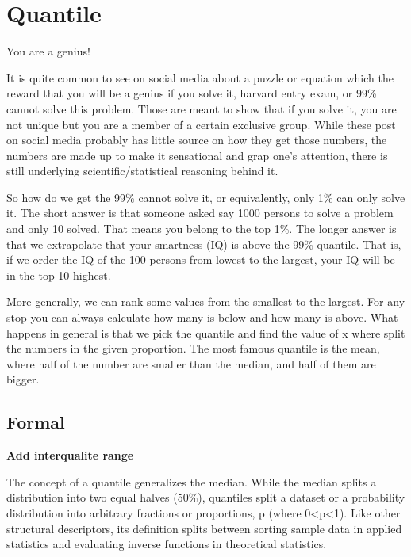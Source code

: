\documentclass[
  letterpaper,
  DIV=11,
  numbers=noendperiod]{scrreprt}
\begin{document}
\chapter{Quantile}\label{sec-quantile}

You are a genius!

It is quite common to see on social media about a puzzle or equation
which the reward that you will be a genius if you solve it, harvard
entry exam, or 99\% cannot solve this problem. Those are meant to show
that if you solve it, you are not unique but you are a member of a
certain exclusive group. While these post on social media probably has
little source on how they get those numbers, the numbers are made up to
make it sensational and grap one's attention, there is still underlying
scientific/statistical reasoning behind it.

So how do we get the 99\% cannot solve it, or equivalently, only 1\% can
only solve it. The short answer is that someone asked say 1000 persons
to solve a problem and only 10 solved. That means you belong to the top
1\%. The longer answer is that we extrapolate that your smartness (IQ)
is above the 99\% quantile. That is, if we order the IQ of the 100
persons from lowest to the largest, your IQ will be in the top 10
highest.

More generally, we can rank some values from the smallest to the
largest. For any stop you can always calculate how many is below and how
many is above. What happens in general is that we pick the quantile and
find the value of x where split the numbers in the given proportion. The
most famous quantile is the mean, where half of the number are smaller
than the median, and half of them are bigger.

\section*{Formal}\label{formal-24}


\textbf{Add interqualite range}

The concept of a quantile generalizes the median. While the median
splits a distribution into two equal halves (50\%), quantiles split a
dataset or a probability distribution into arbitrary fractions or
proportions, p (where 0\textless p\textless1). Like other structural
descriptors, its definition splits between sorting sample data in
applied statistics and evaluating inverse functions in theoretical
statistics.
\end{document}
